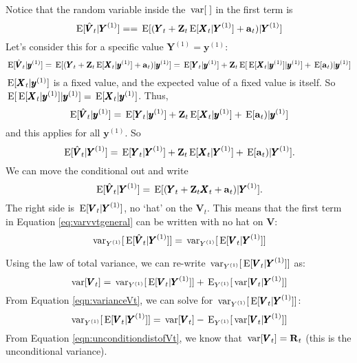 \documentclass[]{article}
\def\XI{\mbox{\boldmath $\Xi$}}
\def\E{\,\textup{\textrm{E}}}
\def\RR{\mbox{$\mathbf R$}}	 \def\rr{\mbox{$\mathbf r$}} \def\Rb{\mbox{$\mathbf H$}}	\def\Rm{\mathbb{R}}
\def\VV{\mbox{$\pmb{V}$}}	\def\vv{\mbox{$\pmb{v}$}}
\def\XX{\mbox{$\pmb{X}$}}	\def\xx{\mbox{$\pmb{x}$}}
\def\YY{\mbox{$\pmb{Y}$}}	\def\yy{\mbox{$\pmb{y}$}}
\def\ZZ{\mbox{$\mathbf Z$}}	\def\zz{\mbox{$\mathbf z$}}	\def\Zb{\mbox{$\mathbf M$}} \def\Za{\mbox{$\mathbf N$}} \def\Zm{\XI}
\def\var{\,\textup{\textrm{var}}}
\begin{document}
Notice that the random variable inside the $\var[\;]$ in the first term is
\begin{equation}
\E[\hat{\VV}_t|\YY^{(1)}]= =\E[(\YY_t + \ZZ_t \E[\XX_t|\YY^{(1)}] + \aa_t)|\YY^{(1)}] 
\end{equation}
Let's consider this for a specific value $\YY^{(1)}=\yy^{(1)}$:
\begin{equation}
\E[\hat{\VV}_t|\yy^{(1)}]= \E[(\YY_t + \ZZ_t \E[\XX_t|\yy^{(1)}] + \aa_t)|\yy^{(1)}] =
\E[\YY_t|\yy^{(1)}] + \ZZ_t \E[\E[\XX_t|\yy^{(1)}]|\yy^{(1)}] + \E[\aa_t)|\yy^{(1)}]
\end{equation}
$\E[\XX_t|\yy^{(1)}]$ is a fixed value, and the expected value of a fixed value is itself. So
$\E[\E[\XX_t|\yy^{(1)}]|\yy^{(1)}]=\E[\XX_t|\yy^{(1)}]$.
Thus,
\begin{equation}
\E[\hat{\VV}_t|\yy^{(1)}]= \E[\YY_t|\yy^{(1)}] + \ZZ_t \E[\XX_t|\yy^{(1)}] + \E[\aa_t)|\yy^{(1)}]
\end{equation}
and this applies for all $\yy^{(1)}$. So
\begin{equation}
\E[\hat{\VV}_t|\YY^{(1)}]= \E[\YY_t|\YY^{(1)}] + \ZZ_t \E[\XX_t|\YY^{(1)}] + \E[\aa_t)|\YY^{(1)}].
\end{equation}
We can move the conditional out and write
\begin{equation}
\E[\hat{\VV}_t|\YY^{(1)}]= \E[(\YY_t + \ZZ_t \XX_t + \aa_t)|\YY^{(1)}].
\end{equation}
The right side is $\E[\VV_t|\YY^{(1)}]$, no `hat' on the $\VV_t$. This means that the first term in Equation \ref{eq:varvvtgeneral} can be written with no hat on $\VV$:
\begin{equation}\label{eq:no.hat.on.V}
\var_{Y^{(1)}}[\E[\hat{\VV}_t|\YY^{(1)}]] = \var_{Y^{(1)}}[\E[\VV_t|\YY^{(1)}]]
\end{equation}

Using the law of total variance, we can re-write $\var_{Y^{(1)}}[\E[\VV_t|\YY^{(1)}]]$ as:
\begin{equation}\label{eqn:varianceVt}
\var[\VV_t] = \var_{Y^{(1)}}[\E[\VV_t|\YY^{(1)}]] + \E_{Y^{(1)}}[\var[\VV_t|\YY^{(1)}]]
\end{equation}
From Equation \ref{eqn:varianceVt}, we can solve for $\var_{Y^{(1)}}[\E[\VV_t|\YY^{(1)}]]$:
\begin{equation}\label{eq:var.E.vtT}
\var_{Y^{(1)}}[\E[\VV_t|\YY^{(1)}]] = \var[\VV_t] - \E_{Y^{(1)}}[\var[\VV_t|\YY^{(1)}]]
\end{equation}
From Equation \ref{eqn:unconditiondistofVt}, we know that $\var[\VV_t]=\RR_t$ (this is the unconditional variance).  
\end{document}
